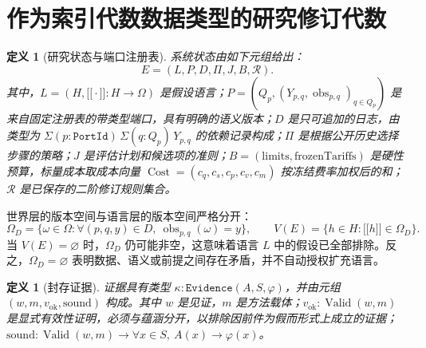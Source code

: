 \documentclass[11pt,a4paper]{article}
\theoremstyle{preprintthm}
\theoremstyle{preprintdef}
\newtheorem{definition}[theorem]{定义}
\newcommand{\Cost}{\operatorname{Cost}}
\newcommand{\obs}{\operatorname{obs}}
\newcommand{\Valid}{\operatorname{Valid}}
\providecommand{\llbracket}{\mathopen{[\![}}
\providecommand{\rrbracket}{\mathclose{]\!]}}
\begin{document}
\section{作为索引代数数据类型的研究修订代数}

\begin{definition}[研究状态与端口注册表]
系统状态由如下元组给出：
\begin{equation}
  E=(L,P,D,\Pi,J,B,\mathcal{R}).
\end{equation}
其中，$L=(H,\llbracket\cdot\rrbracket:H\to\Omega)$ 是假设语言；$P=(Q_p,(Y_{p,q},\obs_{p,q})_{q\in Q_p})$ 是来自固定注册表的带类型端口，具有明确的语义版本；$D$ 是只可追加的日志，由类型为 $\Sigma(p:\texttt{PortId})\,\Sigma(q:Q_p)\,Y_{p,q}$ 的依赖记录构成；$\Pi$ 是根据公开历史选择步骤的策略；$J$ 是评估计划和候选项的准则；$B=(\mathrm{limits},\mathrm{frozenTariffs})$ 是硬性预算，标量成本取成本向量 $\Cost=(c_q,c_s,c_p,c_v,c_m)$ 按冻结费率加权后的和；$\mathcal{R}$ 是已保存的二阶修订规则集合。
\end{definition}

世界层的版本空间与语言层的版本空间严格分开：
\begin{equation}
  \Omega_D=\{\omega\in\Omega:\forall(p,q,y)\in D,\ \obs_{p,q}(\omega)=y\},
  \qquad V(E)=\{h\in H:\llbracket h\rrbracket\in\Omega_D\}.
\end{equation}
当 $V(E)=\varnothing$ 时，$\Omega_D$ 仍可能非空，这意味着语言 $L$ 中的假设已全部排除。反之，$\Omega_D=\varnothing$ 表明数据、语义或前提之间存在矛盾，并不自动授权扩充语言。

\begin{definition}[封存证据]
证据具有类型 $\kappa:\texttt{Evidence}(A,S,\varphi)$，并由元组 $(w,m,v_{\mathrm{ok}},\mathrm{sound})$ 构成。其中 $w$ 是见证，$m$ 是方法载体；$v_{\mathrm{ok}}:\Valid(w,m)$ 是显式有效性证明，必须与蕴涵分开，以排除因前件为假而形式上成立的证据；$\mathrm{sound}:\Valid(w,m)\to\forall x\in S,\ A(x)\to\varphi(x)$。
\end{definition}
\end{document}
